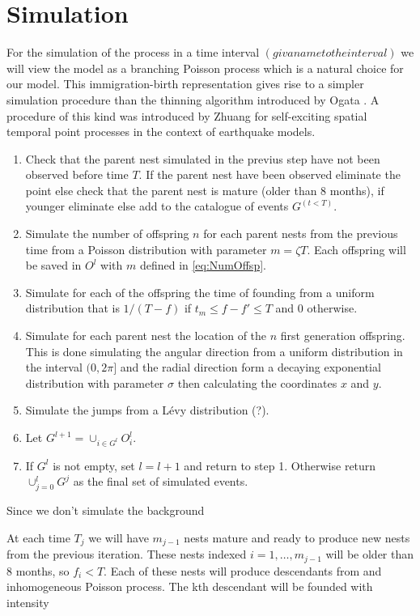 \documentclass[11pt,a4paper]{article}
\begin{document}
{\color{red}\section{Simulation}

For the simulation of the process in a time interval $(givanametotheinterval)$ we will view the model as a branching Poisson process \cite{Lewis} which is a natural choice for our model. This immigration-birth representation gives rise to a simpler simulation procedure than the thinning algorithm introduced by Ogata \cite{Ogata}. A procedure of this kind was introduced by Zhuang \cite{Zhuang} for self-exciting spatial temporal point processes in the context of earthquake models.

\begin{enumerate}
    \item Check that the parent nest simulated in the previus step have not been observed before time $T$. If the parent nest have been observed eliminate the point else check that the parent nest is mature (older than 8 months), if younger eliminate else add to the catalogue of events $G^{(t<T)}$.
    \item Simulate the number of offspring $n$ for each parent nests from the previous time from a Poisson distribution with parameter $ m = \zeta T$. Each offspring will be saved in $O^l$ with $m$  defined in \ref{eq:NumOffsp}.
    \item Simulate for each of the offspring the time of founding from a uniform distribution that is $1/(T-f)$ if $t_m \leq f - f' \leq T $ and $0$ otherwise.
    \item Simulate for each parent nest the location of the $n$ first generation offspring. This is done simulating the angular direction from a uniform distribution in the interval $(0, 2\pi]$ and the radial direction form a decaying exponential distribution with parameter $\sigma$ then calculating the coordinates $x$ and $y$.
    \item Simulate the jumps from a L\'evy distribution (?).
    \item Let $G^{l+1} = \cup_{i\in G^l} O_i^l$.
    \item If $G^l$ is not empty, set $l = l+1$ and return to step 1. Otherwise return $\cup_{j=0}^l G^j$ as the final set of simulated events.
\end{enumerate}

Since we don't simulate the background


At each time $T_j$ we will have $m_{j-1}$ nests mature and ready to produce new nests from the previous iteration. These nests indexed $i = 1, \dots, m_{j-1}$ will be older than 8 months, so $f_i < T$. Each of these nests will produce descendants from and inhomogeneous Poisson process. The kth descendant will be founded with intensity 


}
\end{document}
